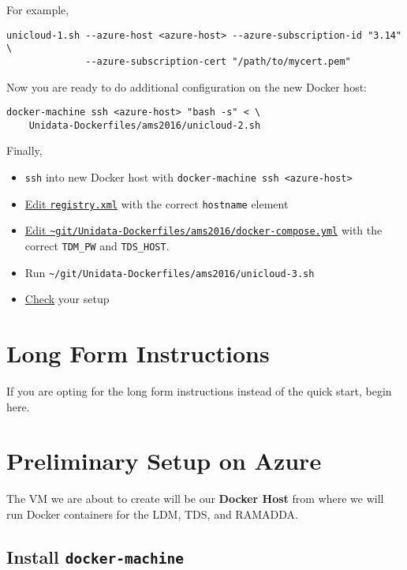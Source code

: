 \documentclass{article}
\begin{document}
For example,

\begin{verbatim}
unicloud-1.sh --azure-host <azure-host> --azure-subscription-id "3.14" \
              --azure-subscription-cert "/path/to/mycert.pem"
\end{verbatim}

Now you are ready to do additional configuration on the new Docker host:

\begin{verbatim}
docker-machine ssh <azure-host> "bash -s" < \
    Unidata-Dockerfiles/ams2016/unicloud-2.sh
\end{verbatim}

Finally,

\begin{itemize}
\item \texttt{ssh} into new Docker host with  \texttt{docker-machine ssh <azure-host>}
\item \hyperref[orgtarget2]{Edit \texttt{registry.xml}} with the correct \texttt{hostname} element
\item \hyperref[orgtarget3]{Edit \texttt{\textasciitilde{}git/Unidata-Dockerfiles/ams2016/docker-compose.yml}} with the correct \texttt{TDM\_PW} and \texttt{TDS\_HOST}.
\item Run \texttt{\textasciitilde{}/git/Unidata-Dockerfiles/ams2016/unicloud-3.sh}
\item \hyperref[orgtarget4]{Check} your setup
\end{itemize}

\section{Long Form Instructions}
\label{sec:orgheadline3}

If you are opting for the long form instructions instead of the quick start, begin here.

\section{Preliminary Setup on Azure}
\label{sec:orgheadline12}

The VM we are about to create will be our \textbf{Docker Host} from where we will run Docker containers for the LDM, TDS, and RAMADDA.

\subsection{Install \texttt{docker-machine}}
\label{sec:orgheadline4}
\end{document}
